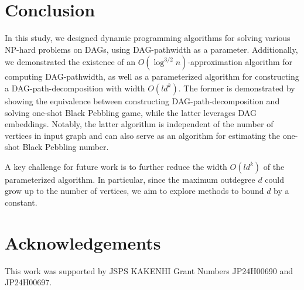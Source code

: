 \documentclass[runningheads]{llncs}
\theoremstyle{plain}
\theoremstyle{definition}
\begin{document}
\section{Conclusion}

In this study, we designed dynamic programming algorithms for solving various NP-hard problems on DAGs, using DAG-pathwidth as a parameter. Additionally, we demonstrated the existence of an $O(\log^{3/2} n)$-approximation algorithm for computing DAG-pathwidth, as well as a parameterized algorithm for constructing a DAG-path-decomposition with width $O(ld^k)$. The former is demonstrated by showing the equivalence between constructing DAG-path-decomposition and solving one-shot Black Pebbling game, while the latter leverages DAG embeddings. Notably, the latter algorithm is independent of the number of vertices in input graph and can also serve as an algorithm for estimating the one-shot Black Pebbling number.

A key challenge for future work is to further reduce the width $O(ld^k)$ of the parameterized algorithm. In particular, since the maximum outdegree $d$ could grow up to the number of vertices, we aim to explore methods to bound $d$ by a constant.























\section*{Acknowledgements}

This work was supported by JSPS KAKENHI Grant Numbers JP24H00690 and JP24H00697.













%
%
%
\nocite{*}


%
\end{document}
